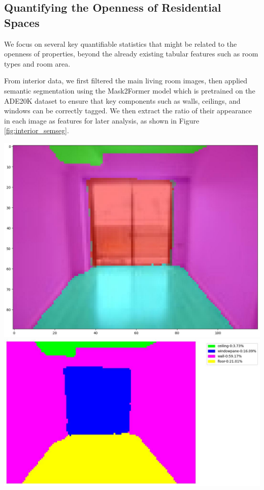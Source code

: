 \documentclass[11pt,a4paper]{article}
\begin{document}
\begin{multicols}{2}
\section{Quantifying the Openness of Residential Spaces}

We focus on several key quantifiable statistics that might be related to the openness of properties, beyond the 
already existing tabular features such as room types and room area.

From interior data, we first filtered the main living room images, then applied semantic segmentation using the 
Mask2Former model which is pretrained on the ADE20K dataset to ensure that key components such as walls, ceilings, 
and windows can be correctly tagged. We then extract the ratio of their appearance in each image as features for 
later analysis, as shown in Figure \ref{fig:interior_semseg}. 
\begin{flushleft}
    \includegraphics[width=0.8\columnwidth]{plots/exp_lv_semseg_2.jpg}
    \\[0.5em]
    \includegraphics[width=\columnwidth]{plots/exp_lv_semseg_1.jpg}
    \label{fig:interior_semseg}
\end{flushleft}



\end{multicols}
\end{document}
